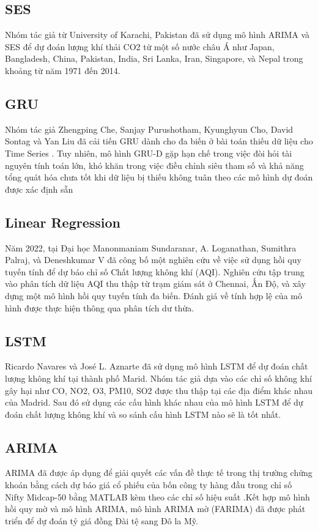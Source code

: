 \documentclass[conference]{IEEEtran}
\begin{document}
\subsection{SES}
Nhóm tác giả từ University of Karachi, Pakistan đã sử dụng mô hình ARIMA và SES để dự đoán lượng khí thải CO2 từ một số nước châu Á như Japan, Bangladesh, China, Pakistan, India, Sri Lanka, Iran, Singapore, và Nepal trong khoảng từ năm 1971 đến 2014. \cite{b11}

\subsection{GRU}
Nhóm tác giả Zhengping Che, Sanjay Purushotham, Kyunghyun Cho, David Sontag và Yan Liu đã cải tiến GRU dành cho đa biến ở bài toán thiếu dữ liệu cho Time Series \cite{che2016recurrent}. Tuy nhiên, mô hình GRU-D gặp hạn chế trong việc đòi hỏi tài nguyên tính toán lớn, khó khăn trong việc điều chỉnh siêu tham số và khả năng tổng quát hóa chưa tốt khi dữ liệu bị thiếu không tuân theo các mô hình dự đoán được xác định sẵn

\subsection{Linear Regression}
Năm 2022, tại Đại học Manonmaniam Sundaranar, A. Loganathan, Sumithra Palraj, và Deneshkumar V đã công bố một nghiên cứu về việc sử dụng hồi quy tuyến tính để dự báo chỉ số Chất lượng không khí (AQI). Nghiên cứu tập trung vào phân tích dữ liệu AQI thu thập từ trạm giám sát ở Chennai, Ấn Độ, và xây dựng một mô hình hồi quy tuyến tính đa biến. Đánh giá về tính hợp lệ của mô hình được thực hiện thông qua phân tích dư thừa. \cite{b18}

\subsection{LSTM}
Ricardo Navares và José L. Aznarte đã sử dụng mô hình LSTM để dự đoán chất lượng không khí tại thành phố Marid. Nhóm tác giả dựa vào các chỉ số không khí gây hại như CO, NO2, O3, PM10, SO2 được thu thập tại các địa điểm khác nhau của Madrid. Sau đó sử dụng các cấu hình khác nhau của mô hình LSTM để dự đoán chất lượng không khí và so sánh cấu hình LSTM nào sẽ là tốt nhất. \cite{b12}

\subsection{ARIMA}
ARIMA đã được áp dụng để giải quyết các vấn đề thực tế trong thị trường chứng khoán bằng cách dự báo giá cổ phiếu của bốn công ty hàng đầu trong chỉ số Nifty Midcap-50 bằng MATLAB kèm theo các chỉ số hiệu suất \cite{b14} .Kết hợp mô hình hồi quy mờ và mô hình ARIMA, mô hình ARIMA mờ (FARIMA) đã được phát triển để dự đoán tỷ giá đồng Đài tệ sang Đô la Mỹ\cite{b15}.
\end{document}
